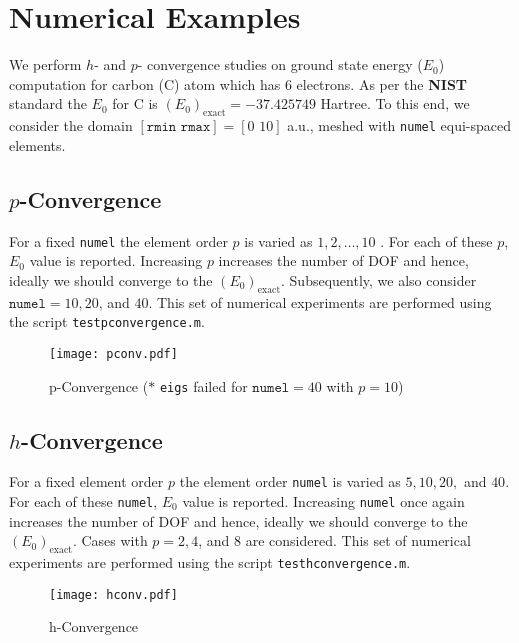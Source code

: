 \section{Numerical Examples}
We perform $h$- and $p$- convergence studies on ground state energy ($E_0$) computation for 
carbon (C) atom which has $6$ electrons. As per the {\bf NIST} standard the $E_0$ for C is $(E_0)_{\textrm{exact}} = -37.425749$ Hartree. 
To this end, we consider the domain $[\texttt{rmin} \, \, \texttt{rmax}] = [0 \, \, 10]$ a.u., meshed with \texttt{numel} equi-spaced 
elements.
%
\subsection{$p$-Convergence} 
For a fixed \texttt{numel} the element order $p$ is varied as $1, 2, \ldots, 10$ . For each of these $p$, $E_0$ value is 
reported. Increasing $p$ increases the number of DOF and hence, ideally we should converge to the $(E_0)_{\textrm{exact}}$. 
Subsequently, we also consider $\texttt{numel} = 10, 20$, and $40$. This set of numerical experiments are performed using 
the script \texttt{testpconvergence.m}.
%
\begin{figure}[h!]
	\centering
	\texttt{[image: pconv.pdf]}
	\caption{p-Convergence ($\ast$ \texttt{eigs} failed for $\texttt{numel} = 40$ with $p = 10$)}
\end{figure}
%
\subsection{$h$-Convergence}
For a fixed element order $p$ the element order \texttt{numel} is varied as $5, 10, 20,$ and $40$. 
For each of these \texttt{numel}, $E_0$ value is reported. Increasing \texttt{numel} once again increases the 
number of DOF and hence, ideally we should converge to the $(E_0)_{\textrm{exact}}$. 
Cases with $p = 2, 4$, and $8$ are considered. This set of numerical experiments are performed using  
the script \texttt{testhconvergence.m}.
\begin{figure}[h!]
	\centering
	\texttt{[image: hconv.pdf]}
	\caption{h-Convergence}
\end{figure}
